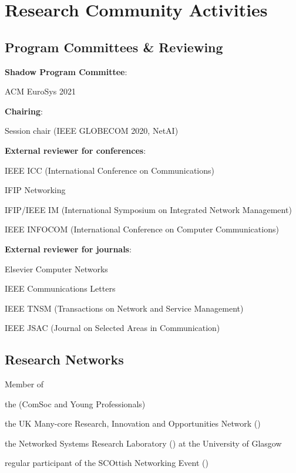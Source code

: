 \section{Research Community Activities}
\subsection{Program Committees \& Reviewing}
\begin{cvitemize}
	\item \textbf{Shadow Program Committee}:
	\begin{inlineItemize}
		\item ACM EuroSys 2021
	\end{inlineItemize}
	\item \textbf{Chairing}:
	\begin{inlineItemize}
		\item Session chair (IEEE GLOBECOM 2020, NetAI)
	\end{inlineItemize}
	\item \textbf{External reviewer for conferences}:
	\begin{inlineItemize}
		\item IEEE ICC (International Conference on Communications)
		\item IFIP Networking
		\item IFIP/IEEE IM (International Symposium on Integrated Network Management)
		\item IEEE INFOCOM (International Conference on Computer Communications)
	\end{inlineItemize}
	\item \textbf{External reviewer for journals}:
	\begin{inlineItemize}
		\item Elsevier Computer Networks
		\item IEEE Communications Letters
		\item IEEE TNSM (Transactions on Network and Service Management)
		\item IEEE JSAC (Journal on Selected Areas in Communication)
	\end{inlineItemize}
\end{cvitemize}

\pagebreak

\subsection{Research Networks}
\begin{cvitemize}
	\item Member of
	\begin{inlineItemize}
		\item the  (ComSoc and Young Professionals)
		\item the UK Many-core Research, Innovation and Opportunities Network ()
		\item the Networked Systems Research Laboratory () at the University of Glasgow
		\item regular participant of the SCOttish Networking Event ()
	\end{inlineItemize}
\end{cvitemize}